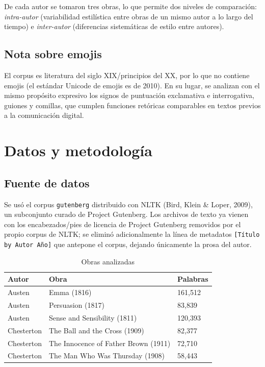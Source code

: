 \documentclass[11pt]{article}
\begin{document}
De cada autor se tomaron tres obras, lo que permite dos niveles de comparación: \emph{intra-autor} (variabilidad estilística entre obras de un mismo autor a lo largo del tiempo) e \emph{inter-autor} (diferencias sistemáticas de estilo entre autores).

\subsection*{Nota sobre emojis}
El corpus es literatura del siglo XIX/principios del XX, por lo que no contiene emojis (el estándar Unicode de emojis es de 2010). En su lugar, se analizan con el mismo propósito expresivo los signos de puntuación exclamativa e interrogativa, guiones y comillas, que cumplen funciones retóricas comparables en textos previos a la comunicación digital.

\section{Datos y metodología}

\subsection{Fuente de datos}
Se usó el corpus \texttt{gutenberg} distribuido con NLTK (Bird, Klein \& Loper, 2009), un subconjunto curado de Project Gutenberg. Los archivos de texto ya vienen con los encabezados/pies de licencia de Project Gutenberg removidos por el propio corpus de NLTK; se eliminó adicionalmente la línea de metadatos \texttt{[Título by Autor Año]} que antepone el corpus, dejando únicamente la prosa del autor.

\begin{table}[H]
\centering
\caption{Obras analizadas}
\begin{tabular}{lll}
\toprule
Autor & Obra & Palabras \\
\midrule
Austen & Emma (1816) & 161{,}512 \\
Austen & Persuasion (1817) & 83{,}839 \\
Austen & Sense and Sensibility (1811) & 120{,}393 \\
Chesterton & The Ball and the Cross (1909) & 82{,}377 \\
Chesterton & The Innocence of Father Brown (1911) & 72{,}710 \\
Chesterton & The Man Who Was Thursday (1908) & 58{,}443 \\
\bottomrule
\end{tabular}
\end{table}
\end{document}
